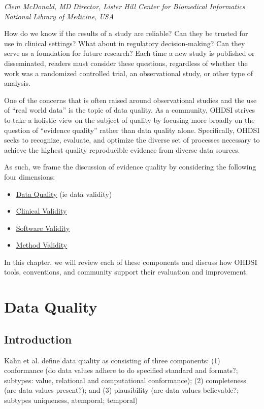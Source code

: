 \documentclass[11pt]{book}
\providecommand{\tightlist}{%
  \setlength{\itemsep}{0pt}\setlength{\parskip}{0pt}}
\begin{document}
\emph{Clem McDonald, MD} \emph{Director, Lister Hill Center for
Biomedical Informatics} \emph{National Library of Medicine, USA}

How do we know if the results of a study are reliable? Can they be
trusted for use in clinical settings? What about in regulatory
decision-making? Can they serve as a foundation for future research?
Each time a new study is published or disseminated, readers must
consider these questions, regardless of whether the work was a
randomized controlled trial, an observational study, or other type of
analysis.

One of the concerns that is often raised around observational studies
and the use of ``real world data'' is the topic of data quality. As a
community, OHDSI strives to take a holistic view on the subject of
quality by focusing more broadly on the question of ``evidence quality''
rather than data quality alone. Specifically, OHDSI seeks to recognize,
evaluate, and optimize the diverse set of processes necessary to achieve
the highest quality reproducible evidence from diverse data sources.

As such, we frame the discussion of evidence quality by considering the
following four dimensions:

\begin{itemize}
\tightlist
\item
  \href{DataQuality.html}{Data Quality} (ie data validity)
\item
  \href{ClinicalValidity.html}{Clinical Validity}
\item
  \href{SoftwareValidity.html}{Software Validity}
\item
  \href{MethodValidity.html}{Method Validity}
\end{itemize}

In this chapter, we will review each of these components and discuss how
OHDSI tools, conventions, and community support their evaluation and
improvement.

\chapter{Data Quality}\label{DataQuality}

\section{Introduction}\label{introduction-2}

Kahn et al. define data quality as consisting of three components: (1)
conformance (do data values adhere to do specified standard and
formats?; subtypes: value, relational and computational conformance);
(2) completeness (are data values present?); and (3) plausibility (are
data values believable?; subtypes uniqueness, atemporal; temporal)
\citep{kahn_harmonized_2016}
\end{document}
